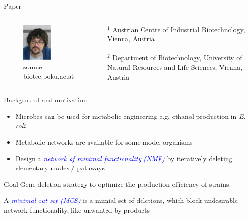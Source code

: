 \documentclass{beamer}
\begin{document}
\begin{frame}{Paper}
\begin{columns}
      \begin{center}
        \begin{figure}
         \includegraphics[width=0.5\textwidth]{grafik/zanghellini} \\
         \tiny{source: biotec.boku.ac.at}
        \end{figure}
      \end{center}
    \tiny {$^{1}$ Austrian Centre of Industrial 
        Biotechnology, Vienna, Austria} 
    \\ ~ \\
    \tiny {$^{2}$ Department of Biotechnology, 
        University of Natural Resources and Life Sciences, 
        Vienna, Austria} 
 \end{columns}
\end{frame}

\begin{frame}{Background and motivation}
    \begin{itemize}
        \item Microbes can be used for metabolic engineering 
        e.g. ethanol production in \emph{E. coli}
        \item Metabolic networks are available for some model organisms
    	\item Design a \emph{\textcolor{blue}{network of minimal functionality (NMF)}}
         by iteratively deleting elementary modes / pathways 
	\end{itemize}
    
    \begin{block}{Goal}
        Gene deletion strategy to optimize the production 
        efficiency of strains.
    \end{block}

    \begin{definition}
        A \emph{\textcolor{blue}{minimal cut set (MCS)}} is a mimial set of deletions, 
        which block undesirable network functionality, like unwanted by-products
    \end{definition}

\end{frame}
\end{document}
